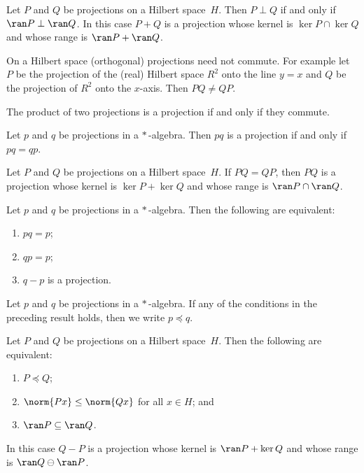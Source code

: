 \begin{prop} Let $P$ and $Q$ be projections on a Hilbert space~$H$. Then $P \perp Q$
if and only if $\ran P \perp \ran Q$. In this case $P + Q$ is a projection
whose kernel is $\ker P \cap \ker Q$ and whose range is $\ran P + \ran Q$.
\end{prop}

\begin{exam} On a Hilbert space (orthogonal) projections need not commute. For example
let $P$ be the projection of the (real) Hilbert space $R^2$ onto the line $y = x$ and $Q$
be the projection of $R^2$ onto the $x$-axis.  Then $PQ \ne QP$.
\end{exam}

The product of two projections is a projection if and only if they commute.

\begin{prop} Let $p$ and $q$ be projections in a $*\,$-algebra. Then $pq$ is a
projection if and only if $pq = qp$.
\end{prop}

\begin{prop} Let $P$ and $Q$ be projections on a Hilbert space~$H$. If $PQ = QP$, then
$PQ$ is a projection whose kernel is $\ker P + \ker Q$ and whose range is $\ran P \cap
\ran Q$.
\end{prop}

\begin{prop} Let $p$ and $q$ be projections in a $*\,$-algebra. Then the following are equivalent:
 \begin{enumerate}[label=\rm{(\alph*)}]
  \item $pq = p$;
  \item $qp = p$;
  \item $q - p$ is a projection.
 \end{enumerate}
\end{prop}

\begin{defn}\label{0022251} Let $p$ and $q$ be projections in a $*\,$-algebra.  If any
of the conditions in the preceding result holds, then we
write $p \preceq q$.
\end{defn}

\begin{prop} Let $P$ and $Q$ be projections on a Hilbert space~$H$. Then the following are equivalent:
 \begin{enumerate}[label=\rm{(\alph*)}]
  \item $P \preceq Q$;
  \item $\norm{Px} \le \norm{Qx}$ for all $x \in H$; and
  \item $\ran P \subseteq \ran Q$.
 \end{enumerate}
In this case $Q - P$ is a projection whose kernel is $\ran P + \ker Q$ and whose range is $\ran Q \ominus \ran P$.
\end{prop}

